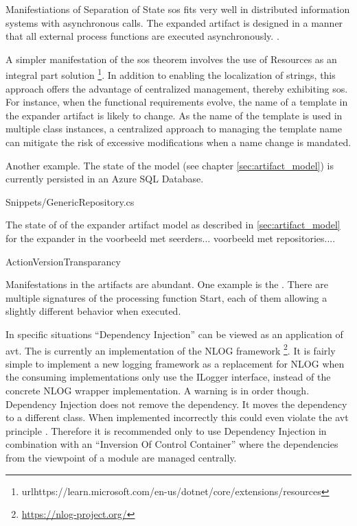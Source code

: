 Manifestiations of Separation of State
\gls{sos} fits very well in distributed information systems with asynchronous calls. The
expanded artifact is designed in a manner that all external process functions are executed
asynchronously. .

A simpler manifestation of the \gls{sos} theorem involves the use of Resources as an
integral part solution
\footnote{url{https://learn.microsoft.com/en-us/dotnet/core/extensions/resources}}. In
addition to enabling the localization of strings, this approach offers the advantage of
centralized management, thereby exhibiting \gls{sos}. For instance, when the functional
requirements evolve, the name of a template in the expander artifact is likely to change.
As the name of the template is used in multiple class instances, a centralized approach to
managing the template name can mitigate the risk of excessive modifications when a name
change is mandated.

Another example. The state of the model (see chapter \ref{sec:artifact_model}) is
currently persisted in an Azure SQL Database.


    {Snippets/GenericRepository.cs}

The state of of the expander artifact model as described in \ref{sec:artifact_model} for the expander in the 
voorbeeld met seerders...
voorbeeld met repositories....



ActionVersionTransparancy

Manifestations in the artifacts are abundant. One example is the
. There are multiple signatures of the
processing function Start, each of them allowing a slightly different behavior when
executed.

In specific situations \enquote{Dependency Injection} can be viewed as an application of
\gls{avt}. The  is currently an implementation of the NLOG
framework \footnote{\url{https://nlog-project.org/}}. It is fairly simple to implement a
new logging framework as a replacement for NLOG when the consuming implementations only
use the ILogger interface, instead of the concrete NLOG wrapper implementation. A warning
is in order though. Dependency Injection does not remove the dependency. It moves the
dependency to a different class. When implemented incorrectly this could even violate the
\gls{avt} principle \parencite[213]{mannaert_normalized_2016}. Therefore it is recommended
only to use Dependency Injection in combination with an \enquote{Inversion Of Control
Container} where the dependencies from the viewpoint of a module are managed centrally.

